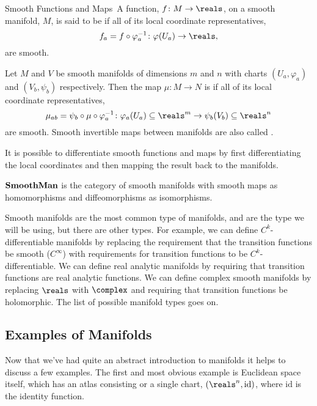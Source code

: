 \begin{dfn}{Smooth Functions and Maps}{}\
    A function, \(f \colon M \to \reals\), on a smooth manifold, \(M\), is said to be  if all of its local coordinate representatives, 
    \begin{equation}
        f_a = f \circ \varphi_a^{-1} \colon \varphi(U_a) \to \reals,
    \end{equation}
    are smooth.
    
    Let \(M\) and \(V\) be smooth manifolds of dimensions \(m\) and \(n\) with charts \((U_a, \varphi_a)\) and \((V_b, \psi_b)\) respectively.
    Then the map \(\mu \colon M \to N\) is \define{smooth}\index{smooth!map} if all of its local coordinate representatives,
    \begin{equation}
        \mu_{ab} = \psi_b \circ \mu \circ \varphi_a^{-1} \colon \varphi_a(U_a) \subseteq \reals^m \to \psi_b(V_b) \subseteq \reals^n
    \end{equation}
    are smooth.
    Smooth invertible maps between manifolds are also called .
\end{dfn}

It is possible to differentiate smooth functions and maps by first differentiating the local coordinates and then mapping the result back to the manifolds.

\(\mathbf{SmoothMan}\) is the category of smooth manifolds with smooth maps as homomorphisms and diffeomorphisms as isomorphisms.

Smooth manifolds are the most common type of manifolds, and are the type we will be using, but there are other types.
For example, we can define \(C^k\)-differentiable manifolds by replacing the requirement that the transition functions be smooth (\(C^{\infty}\)) with requirements for transition functions to be \(C^k\)-differentiable.
We can define real analytic manifolds by requiring that transition functions are real analytic functions.
We can define complex smooth manifolds by replacing \(\reals\) with \(\complex\) and requiring that transition functions be holomorphic.
The list of possible manifold types goes on.

\subsection{Examples of Manifolds}
Now that we've had quite an abstract introduction to manifolds it helps to discuss a few examples.
The first and most obvious example is Euclidean space itself, which has an atlas consisting or a single chart, \((\reals^n, \mathrm{id})\), where \(\mathrm{id}\) is the identity function.

